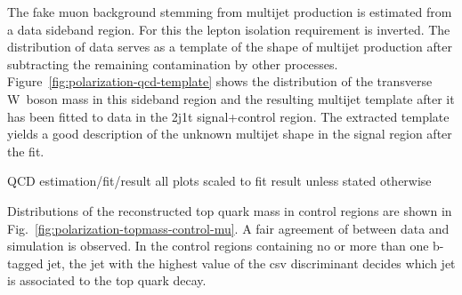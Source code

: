 The fake muon background stemming from multijet production is estimated from a data sideband region. For this the lepton isolation requirement is inverted. The distribution of data serves as a template of the shape of multijet production after subtracting the remaining contamination by other processes. Figure~\ref{fig:polarization-qcd-template} shows the distribution of the transverse W~boson mass in this sideband region and the resulting multijet template after it has been fitted to data in the 2j1t signal+control region. The extracted template yields a good description of the unknown multijet shape in the signal region after the fit.

QCD estimation/fit/result
all plots scaled to fit result unless stated otherwise


Distributions of the reconstructed top quark mass in control regions are shown in Fig.~\ref{fig:polarization-topmass-control-mu}. A fair agreement of between data and simulation is observed. In the control regions containing no or more than one b-tagged jet, the jet with the highest value of the \gls{csv} discriminant decides which jet is associated to the top quark decay.








